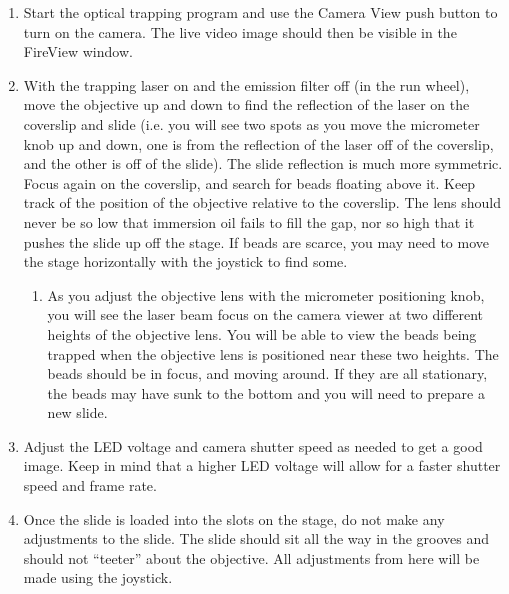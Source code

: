 \documentclass{../lab}
\begin{document}
\begin{enumerate}
    \item Start the optical trapping program and use the Camera View push button to turn on the camera. The live video image should then be visible in the FireView window.

    \item With the trapping laser on and the emission filter off (in the run wheel), move the objective up and down to find the reflection of the laser on the coverslip and slide (i.e. you will see two spots as you move the micrometer knob up and down, one is from the reflection of the laser off of the coverslip, and the other is off of the slide). The slide reflection is much more symmetric. Focus again on the coverslip, and search for beads floating above it. Keep track of the position of the objective relative to the coverslip. The lens should never be so low that immersion oil fails to fill the gap, nor so high that it pushes the slide up off the stage. If beads are scarce, you may need to move the stage horizontally with the joystick to find some.

    \begin{enumerate}
        \item As you adjust the objective lens with the micrometer positioning knob, you will see the laser beam focus on the camera viewer at two different heights of the objective lens. You will be able to view the beads being trapped when the objective lens is positioned near these two heights. The beads should be in focus, and moving around. If they are all stationary, the beads may have sunk to the bottom and you will need to prepare a new slide.

    \end{enumerate}

    \item Adjust the LED voltage and camera shutter speed as needed to get a good image. Keep in mind that a higher LED voltage will allow for a faster shutter speed and frame rate.

    \item Once the slide is loaded into the slots on the stage, do not make any adjustments to the slide. The slide should sit all the way in the grooves and should not ``teeter'' about the objective. All adjustments from here will be made using the joystick.
\end{enumerate}
\end{document}
